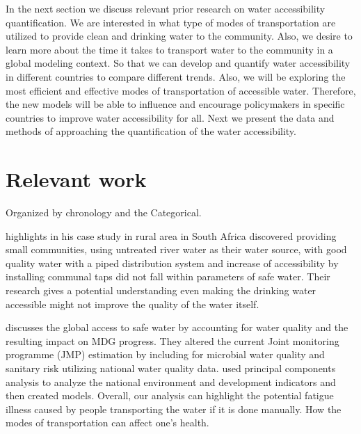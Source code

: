 \documentclass[10pt,twoside]{article}
\numberwithin{equation}{section}
\newcommand{\?}{\stackrel{?}{=}}
\newcommand{\rd}{\color{red}}
\begin{document}

In the next section we discuss relevant prior research on water accessibility quantification. We are interested in what type of modes of
transportation are utilized to provide clean and drinking water to the community. Also, we desire to learn more about
the time it takes to transport water to the community in a global modeling context. So that we can develop and quantify
water accessibility in different countries to compare different trends. Also, we will be exploring the most efficient
and effective modes of transportation of accessible water. Therefore, the new models will be able to influence and
encourage policymakers in specific countries to improve water accessibility for all. Next we present the data and methods of approaching the quantification of the water accessibility. 
 
\section{Relevant work}
Organized by chronology and the Categorical. 

\citet{jagals2006does} highlights in his case study in rural area in South Africa discovered providing small communities, using untreated river water as their water source, with good quality water with a piped distribution system and increase of accessibility by installing communal taps did not fall within parameters of safe water. Their research gives a potential understanding even making the drinking water accessible might not improve the quality of the water itself. 

\citet{onda2012global} discusses the global access to safe water by accounting for water quality and the resulting impact
on MDG progress. They altered the current Joint monitoring programme (JMP) estimation by
including for microbial water quality and sanitary risk utilizing national water quality data. \citet{onda2012global}
used principal components analysis to analyze the national environment and development indicators and then created
models. Overall, our analysis can highlight the potential fatigue illness caused by people transporting the water if it
is done manually. How the modes of transportation can affect one's health.
\end{document}
